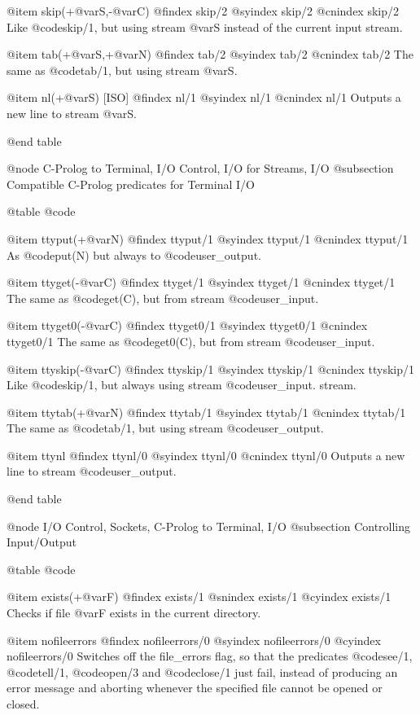 {{{{{@item skip(+@var{S},-@var{C})
@findex skip/2
@syindex skip/2
@cnindex skip/2
Like @code{skip/1}, but using stream @var{S} instead of the current
input stream.

@item tab(+@var{S},+@var{N})
@findex tab/2
@syindex tab/2
@cnindex tab/2
The same as @code{tab/1}, but using stream @var{S}.

@item nl(+@var{S}) [ISO]
@findex nl/1
@syindex nl/1
@cnindex nl/1
Outputs a new line to stream @var{S}.

@end table

@node C-Prolog to Terminal, I/O Control, I/O for Streams, I/O
@subsection Compatible C-Prolog predicates for Terminal I/O

@table @code

@item ttyput(+@var{N})
@findex ttyput/1
@syindex ttyput/1
@cnindex ttyput/1
As @code{put(N)} but always to @code{user_output}.

@item ttyget(-@var{C})
@findex ttyget/1
@syindex ttyget/1
@cnindex ttyget/1
The same as @code{get(C)}, but from stream @code{user_input}.

@item ttyget0(-@var{C})
@findex ttyget0/1
@syindex ttyget0/1
@cnindex ttyget0/1
The same as @code{get0(C)}, but from stream @code{user_input}.

@item ttyskip(-@var{C})
@findex ttyskip/1
@syindex ttyskip/1
@cnindex ttyskip/1
Like @code{skip/1}, but always using stream @code{user_input}.
stream.

@item ttytab(+@var{N})
@findex ttytab/1
@syindex ttytab/1
@cnindex ttytab/1
The same as @code{tab/1}, but using stream @code{user_output}.

@item ttynl
@findex ttynl/0
@syindex ttynl/0
@cnindex ttynl/0
Outputs a new line to stream @code{user_output}.

@end table

@node I/O Control, Sockets, C-Prolog to Terminal, I/O
@subsection Controlling Input/Output

@table @code

@item exists(+@var{F})
@findex exists/1
@snindex exists/1
@cyindex exists/1
Checks if file @var{F} exists in the current directory.

@item nofileerrors
@findex nofileerrors/0
@syindex nofileerrors/0
@cyindex nofileerrors/0
Switches off the file_errors flag, so that the predicates @code{see/1},
@code{tell/1}, @code{open/3} and @code{close/1} just fail, instead of producing
an error message and aborting whenever the specified file cannot be
opened or closed.

}}}}}

